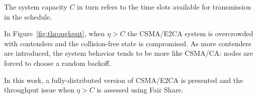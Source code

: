 The system capacity $C$ in turn refers to the time slots available for transmission in the schedule. 


In Figure~\ref{fig:throughput}, when $\eta > C$ the CSMA/E2CA system is overcrowded with contenders and the collision-free state is compromised. As more contenders are introduced, the system behavior tends to be more like CSMA/CA: nodes are forced to choose a random backoff.

In this work, a fully-distributed version of CSMA/E2CA is presented and the throughput issue when $\eta > C$ is assessed using Fair Share.